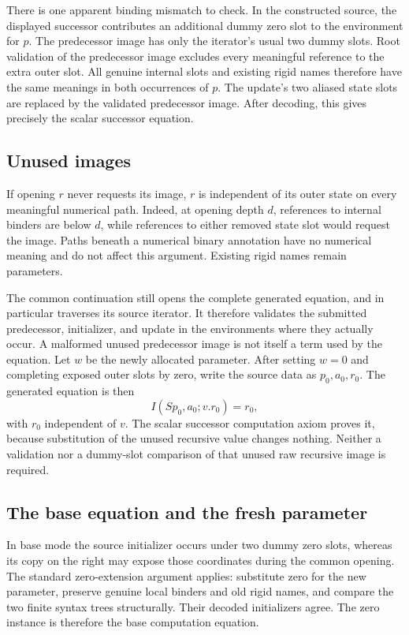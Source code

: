 There is one apparent binding mismatch to check.  In the constructed
source, the displayed successor contributes an additional dummy zero
slot to the environment for $p$.  The predecessor image has only the
iterator's usual two dummy slots.  Root validation of the predecessor
image excludes every meaningful reference to the extra outer slot.
All genuine internal slots and existing rigid names therefore have the
same meanings in both occurrences of $p$.  The update's two aliased
state slots are replaced by the validated predecessor image.  After
decoding, this gives precisely the scalar successor equation.

\subsection{Unused images}

If opening $r$ never requests its image, $r$ is independent of its outer
state on every meaningful numerical path.  Indeed, at opening depth
$d$, references to internal binders are below $d$, while references to
either removed state slot would request the image.  Paths beneath a
numerical binary annotation have no numerical meaning and do not affect
this argument.  Existing rigid names remain parameters.

The common continuation still opens the complete generated equation,
and in particular traverses its source iterator.  It therefore validates
the submitted predecessor, initializer, and update in the environments
where they actually occur.  A malformed unused predecessor image is
not itself a term used by the equation.  Let $w$ be the newly allocated
parameter.  After setting $w=0$ and completing exposed outer slots by
zero, write the source data as $p_0,a_0,r_0$.  The generated equation is
then
\[
 I(Sp_0,a_0;v.r_0)=r_0,
\]
with $r_0$ independent of $v$.  The scalar successor computation axiom
proves it, because substitution of the unused recursive value changes
nothing.  Neither a validation nor a dummy-slot comparison of that
unused raw recursive image is required.

\subsection{The base equation and the fresh parameter}

In base mode the source initializer occurs under two dummy zero slots,
whereas its copy on the right may expose those coordinates during the
common opening.  The standard zero-extension argument applies: substitute
zero for the new parameter, preserve genuine local binders and old rigid
names, and compare the two finite syntax trees structurally.  Their
decoded initializers agree.  The zero instance is therefore the base
computation equation.

